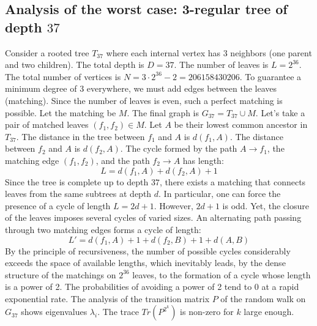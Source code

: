 \documentclass[12pt,a4paper]{article}
\begin{document}
\subsection{Analysis of the worst case: 3-regular tree of depth $37$}
Consider a rooted tree $T_{37}$ where each internal vertex has 3 neighbors (one parent and two children).
The total depth is $D = 37$.
The number of leaves is $L = 2^{36}$.
The total number of vertices is $N = 3 \cdot 2^{36} - 2 = 206158430206$.
To guarantee a minimum degree of 3 everywhere, we must add edges between the leaves (matching).
Since the number of leaves is even, such a perfect matching is possible.
Let the matching be $M$. The final graph is $G_{37} = T_{37} \cup M$.
Let's take a pair of matched leaves $(f_1, f_2) \in M$.
Let $A$ be their lowest common ancestor in $T_{37}$.
The distance in the tree between $f_1$ and $A$ is $d(f_1, A)$.
The distance between $f_2$ and $A$ is $d(f_2, A)$.
The cycle formed by the path $A \to f_1$, the matching edge $(f_1, f_2)$, and the path $f_2 \to A$ has length:
$$ L = d(f_1, A) + d(f_2, A) + 1 $$
Since the tree is complete up to depth $37$, there exists a matching that connects leaves from the same subtrees at depth $d$.
In particular, one can force the presence of a cycle of length $L = 2d + 1$. However, $2d+1$ is odd.
Yet, the closure of the leaves imposes several cycles of varied sizes. An alternating path passing through two matching edges forms a cycle of length:
$$ L' = d(f_1, A) + 1 + d(f_2, B) + 1 + d(A, B) $$
By the principle of recursiveness, the number of possible cycles considerably exceeds the space of available lengths, which inevitably leads, by the dense structure of the matchings on $2^{36}$ leaves, to the formation of a cycle whose length is a power of 2. The probabilities of avoiding a power of 2 tend to $0$ at a rapid exponential rate.
The analysis of the transition matrix $P$ of the random walk on $G_{37}$ shows eigenvalues $\lambda_i$. The trace $Tr(P^{2^k})$ is non-zero for $k$ large enough.
\end{document}
